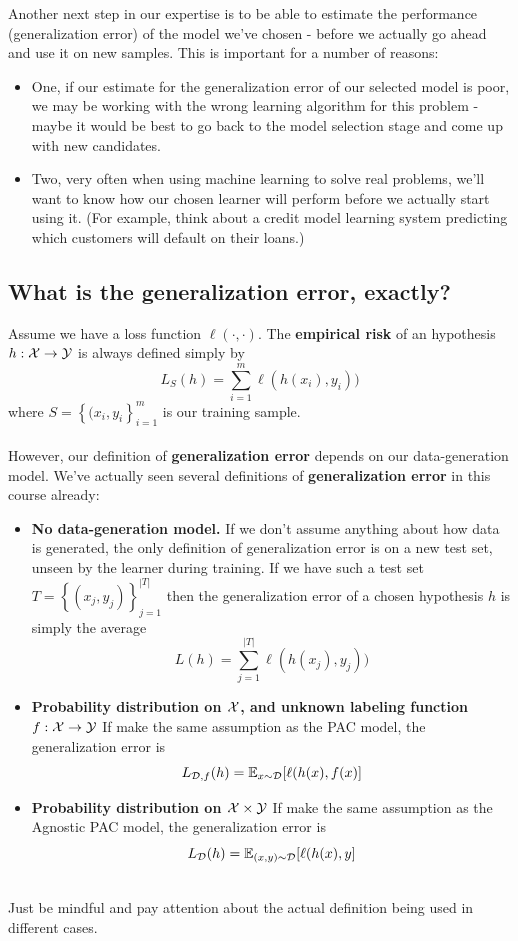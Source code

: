 Another next step in our expertise is to be able to estimate the performance
(generalization error) of the model we've chosen - before we actually go ahead
and use it on
new samples. This is important for a number
of reasons:
\begin{itemize}
  \item One, if our estimate for the generalization error of our selected
model is poor, we may be working with the wrong
learning algorithm for this problem - maybe it would be best to go back to the
model selection stage and come up with new candidates. 
\item Two, very often when
using machine learning to solve real problems, we'll
want to know how our chosen learner will perform before we actually start using it.
(For example, think about a credit model learning system predicting which
customers will default on their loans.)
\end{itemize}

\subsection{What is the generalization error, exactly?}



Assume we have a loss function $\ell(\cdot,\cdot)$. 
The {\bf empirical risk} of an hypothesis $h:\mathcal{X}\to\mathcal{Y}$ 
is always defined simply by 
\[
L_S(h) = \sum_{i=1}^m \ell(h(x_i),y_i))
\]
where $S=\left\{ (x_i,y_i \right\}_{i=1}^m$ is our training sample.
\\~\\
However, our definition of {\bf generalization error} 
 depends on our data-generation model.
We've actually seen several definitions of {\bf generalization error} 
in this course already:

\begin{itemize}
  \item {\bf No data-generation model.}
    If we don't assume anything about how data is generated, the only definition
    of generalization error is on a new test set, unseen by the learner during
    training. If we have such a test set 
    $T=\left\{ (x_j,y_j) \right\}_{j=1}^{|T|}$
      then the generalization error of a chosen hypothesis $h$ is simply the average 
        \[
        L(h) = \sum_{j=1}^{|T|} \ell(h(x_j),y_j))
\]
\item {\bf Probability distribution on $\mathcal{X}$, and unknown labeling function
  $f:\mathcal{X}\to\mathcal{Y}$}
    If make the same assumption as the PAC model, the generalization error is 
 \[
   L_{\mathcal{D},f}(h) = \mathbb{E}_{x\sim\mathcal{D}} [\ell(h(x),f(x)]
\]
\item {\bf Probability distribution on $\mathcal{X}\times \mathcal{Y}$}
    If make the same assumption as the Agnostic PAC model, the generalization error is 
 \[
   L_{\mathcal{D}}(h) = \mathbb{E}_{(x,y)\sim\mathcal{D}} [\ell(h(x),y]
\]
      
\end{itemize}
~\\
Just be mindful and pay attention about the actual definition being used in
different cases.



